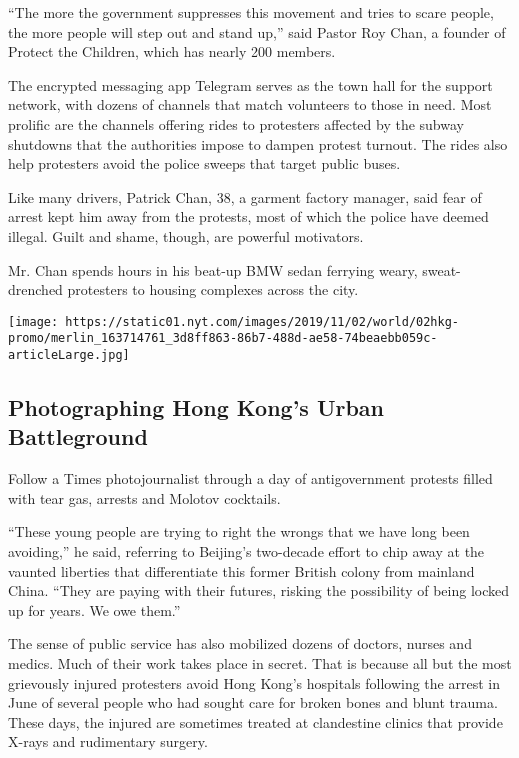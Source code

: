 ``The more the government suppresses this movement and tries to scare
people, the more people will step out and stand up,'' said Pastor Roy
Chan, a founder of Protect the Children, which has nearly 200 members.

The encrypted messaging app Telegram serves as the town hall for the
support network, with dozens of channels that match volunteers to those
in need. Most prolific are the channels offering rides to protesters
affected by the subway shutdowns that the authorities impose to dampen
protest turnout. The rides also help protesters avoid the police sweeps
that target public buses.

Like many drivers, Patrick Chan, 38, a garment factory manager, said
fear of arrest kept him away from the protests, most of which the police
have deemed illegal. Guilt and shame, though, are powerful motivators.

Mr. Chan spends hours in his beat-up BMW sedan ferrying weary,
sweat-drenched protesters to housing complexes across the city.

\href{https://www.nytimes.com/interactive/2019/11/02/world/asia/hong-kong-protest-photos.html}{}

\texttt{[image: https://static01.nyt.com/images/2019/11/02/world/02hkg-promo/merlin\_163714761\_3d8ff863-86b7-488d-ae58-74beaebb059c-articleLarge.jpg]}

\hypertarget{photographing-hong-kongs-urban-battleground}{%
\subsection{Photographing Hong Kong's Urban
Battleground}\label{photographing-hong-kongs-urban-battleground}}

Follow a Times photojournalist through a day of antigovernment protests
filled with tear gas, arrests and Molotov cocktails.

``These young people are trying to right the wrongs that we have long
been avoiding,'' he said, referring to Beijing's two-decade effort to
chip away at the vaunted liberties that differentiate this former
British colony from mainland China. ``They are paying with their
futures, risking the possibility of being locked up for years. We owe
them.''

The sense of public service has also mobilized dozens of doctors, nurses
and medics. Much of their work takes place in secret. That is because
all but the most grievously injured protesters avoid Hong Kong's
hospitals following the arrest in June of several people who had sought
care for broken bones and blunt trauma. These days, the injured are
sometimes treated at clandestine clinics that provide X-rays and
rudimentary surgery.

